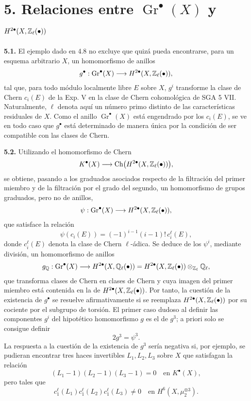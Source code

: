 
\providecommand{\sisi}[2]{#2}

\section*{5. Relaciones entre $\operatorname{Gr}^\bullet(X)$ y
$H^{2\bullet}(X,\mathbb Z_\ell(\bullet))$}

\textbf{5.1.} El ejemplo dado en 4.8 no excluye que quizá pueda encontrarse,
para un esquema arbitrario $X$, un homomorfismo de anillos
\[
g^\bullet:\operatorname{Gr}^\bullet(X)\longrightarrow
H^{2\bullet}(X,\mathbb Z_\ell(\bullet)),
\]
tal que, para todo módulo localmente libre $E$ sobre $X$, $g^i$ transforme
la clase de Chern $c_i(E)$ de la Exp. V en la clase de Chern cohomológica de
SGA 5 VII. Naturalmente, $\ell$ denota aquí un número primo distinto de las
características residuales de $X$. Como el anillo
$\operatorname{Gr}^\bullet(X)$ está engendrado por los $\sisi{c^i}{c_i}(E)$, se ve en %
todo caso que $g^\bullet$ está determinado de manera única por la condición de ser
compatible con las clases de Chern.

\textbf{5.2.} Utilizando el homomorfismo de Chern
\[
K^\bullet(X)\longrightarrow
\operatorname{Ch}\bigl(H^{2\bullet}(X,\mathbb Z_\ell(\bullet))\bigr),
\]
se obtiene, pasando a los graduados asociados respecto de la filtración del
primer miembro y de la filtración por el grado del segundo, un homomorfismo
de grupos graduados, pero no de anillos,
\[
\psi:\operatorname{Gr}^\bullet(X)\longrightarrow
H^{2\bullet}(X,\mathbb Z_\ell(\bullet)),
\]
que satisface la relación
\[
\psi(c_i(E))=(-1)^{i-1}(i-1)!\,c_i^\ell(E),
\]
donde $c_i^\ell(E)$ denota la clase de Chern $\ell$-ádica. Se deduce de los
$\psi^i$, mediante división, un homomorfismo de anillos
\[
g_\mathbb Q:\operatorname{Gr}^\bullet(X)\longrightarrow
H^{2\bullet}(X,\mathbb Q_\ell(\bullet))=
H^{2\bullet}(X,\mathbb Z_\ell(\bullet))\otimes_{\mathbb Z_\ell}\mathbb Q_\ell,
\]
que transforma clases de Chern en clases de Chern y cuya imagen del primer
miembro está contenida en la de
$\sisi{H^2(X,\Zell(\bullet))}{H^{2\bullet}(X,\Zell(\bullet))}$. Por tanto,
la cuestión de la existencia de $g^\bullet$ se resuelve afirmativamente si se
reemplaza $H^{2\bullet}(X,\mathbb Z_\ell(\bullet))$ por su cociente por el subgrupo de
torsión. El primer caso dudoso al definir las componentes $g^i$ del
hipotético homomorfismo $g$ es el de $g^3$; a priori solo se consigue definir
\[
2g^3=\psi^3.
\]
La respuesta a la cuestión de la existencia de $g^3$ sería negativa si, por
ejemplo, se pudieran encontrar tres haces invertibles $L_1,L_2,L_3$ sobre
$X$ que satisfagan la relación
\[
(L_1-1)(L_2-1)(L_3-1)=0\quad\text{en }K^\bullet(X),
\]
pero tales que
\[
c_1^\ell(L_1)c_1^\ell(L_2)c_1^\ell(L_3)\ne0
\quad\text{en }H^6(X,\mu_2^{\otimes3}).
\]

